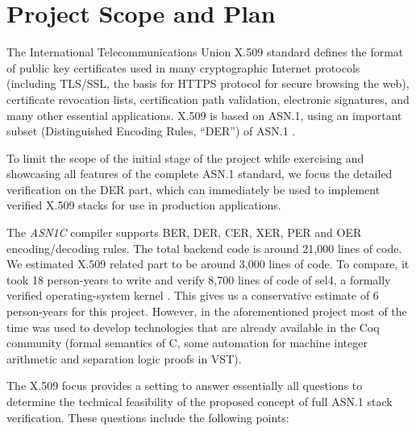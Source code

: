 \documentclass[10p,conference]{IEEEtran}
\begin{document}
\section{Project Scope and Plan}

The International Telecommunications Union X.509 standard
\cite{X509} defines the format of public key certificates used in
many cryptographic Internet protocols (including TLS/SSL, the basis
for HTTPS protocol for secure browsing the web), certificate
revocation lists, certification path validation, electronic
signatures, and many other essential applications. X.509 is based on
ASN.1, using an important subset (Distinguished
Encoding Rules, ``DER'') of ASN.1 \cite{BERandDER}.

To limit the scope of the initial stage of the project while
exercising and showcasing all features of the complete ASN.1
standard, we focus the detailed verification on the DER part,
which can immediately be used to implement verified X.509
stacks for use in production applications.

The \emph{ASN1C} compiler supports BER, DER, CER, XER, PER and OER encoding/decoding rules. The total backend code is around 21,000 lines of code. We estimated X.509 related part to be around 3,000 lines of code. To compare, it took 18 person-years to write and verify 8,700 lines of code of sel4, a formally verified operating-system kernel \cite{VNSSforSel4}. This gives us a conservative estimate of 6 person-years for this project. However, in the aforementioned project most of the time was used to develop technologies that are already available in the Coq community (formal semantics of C, some automation for machine integer arithmetic and separation logic proofs in VST). 

The X.509 focus provides a setting to answer essentially all questions
to determine the technical feasibility of the
proposed concept of full ASN.1 stack verification. These questions
include the following points:
\end{document}
